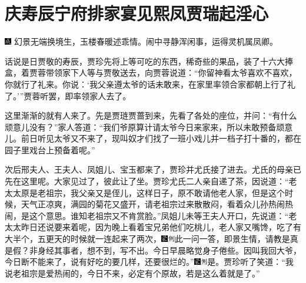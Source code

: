 

\chapter{庆寿辰宁府排家宴\hspace{.5em}见熙凤贾瑞起淫心}

{\includegraphics[width=3mm]{../Images/00005}  \kaishu 幻景无端换境生，玉楼春暖述乖情。闹中寻静浑闲事，运得灵机属凤卿。}

话说是日贾敬的寿辰，贾珍先将上等可吃的东西，稀奇些的果品，装了十六大捧盒，着贾蓉带领家下人等与贾敬送去，向贾蓉说道：``你留神看太爷喜欢不喜欢，你就行了礼来。你说：`我父亲遵太爷的话未敢来，在家里率领合家都朝上行了礼了。'''贾蓉听罢，即率领家人去了。

这里渐渐的就有人来了。先是贾琏贾蔷到来，先看了各处的座位，并问：``有什么顽意儿没有？''家人答道：``我们爷原算计请太爷今日来家来，所以未敢预备顽意儿。前日听见太爷又不来了，现叫奴才们找了一班小戏儿并一档子打十番的，都在园子里戏台上预备着呢。''

次后邢夫人、王夫人、凤姐儿、宝玉都来了，贾珍并尤氏接了进去。尤氏的母亲已先在这里呢。大家见过了，彼此让了坐。贾珍尤氏二人亲自递了茶，因说道：``老太太原是老祖宗，我父亲又是侄儿，这样日子，原不敢请他老人家，但是这个时候，天气正凉爽，满园的菊花又盛开，请老祖宗过来散散闷，看着众儿孙热闹热闹，是这个意思。谁知老祖宗又不肯赏脸。''凤姐儿未等王夫人开口，先说道：``老太太昨日还说要来着呢，因为晚上看着宝兄弟他们吃桃儿，老人家又嘴馋，吃了有大半个，五更天的时候就一连起来了两次，{\includegraphics[width=3mm]{../Images/00006}\includegraphics[width=3mm]{../Images/00011}\footnotesize \kaishu 此一问一答，即景生情，请教是真是假？非身经其事者，想不到，写不出。}今日早晨略觉身子倦些。因叫我回大爷，今日断不能来了，说有好吃的要几样，还要很烂的。''{\includegraphics[width=3mm]{../Images/00006}\includegraphics[width=3mm]{../Images/00011}\footnotesize \kaishu 是。}贾珍听了笑道：``我说老祖宗是爱热闹的，今日不来，必定有个原故，若是这么着就是了。''


